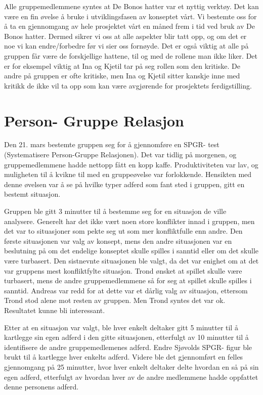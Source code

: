 Alle gruppemedlemmene syntes at De Bonos hatter var et nyttig verktøy. Det kan være en fin øvelse å bruke i utviklingsfasen av konseptet vårt. Vi bestemte oss for å ta en gjennomgang av hele prosjektet vårt en måned frem i tid ved bruk av De Bonos hatter. Dermed sikrer vi oss at alle aspekter blir tatt opp, og om det er noe vi kan endre/forbedre før vi sier oss fornøyde. Det er også viktig at alle på gruppen får være de forskjellige hattene, til og med de rollene man ikke liker. Det er for eksempel viktig at Ina og Kjetil tar på seg rollen som den kritiske. De andre på gruppen er ofte kritiske, men Ina og Kjetil sitter kanskje inne med kritikk de ikke vil ta opp som kan være avgjørende for prosjektets ferdigstilling. 



\section{Person- Gruppe Relasjon} %
Den 21. mars bestemte gruppen seg for å gjennomføre en SPGR- test (Systematisere Person-Gruppe Relasjonen). Det var tidlig på morgenen, og gruppemedlemmene hadde nettopp fått en kopp kaffe. Produktiviteten var lav, og muligheten til å kvikne til med en gruppeøvelse var forlokkende. Hensikten med denne øvelsen var å se på hvilke typer adferd som fant sted i gruppen, gitt en bestemt situasjon. 

Gruppen ble gitt 3 minutter til å bestemme seg for en situasjon de ville analysere. Generelt har det ikke vært noen store konflikter innad i gruppen, men det var to situasjoner som pekte seg ut som mer konfliktfulle enn andre. Den første situasjonen var valg av konsept, mens den andre situasjonen var en beslutning på om det endelige konseptet skulle spilles i sanntid eller om det skulle være turbasert. Den sistnevnte situasjonen ble valgt, da det var enighet om at det var gruppens mest konfliktfylte situasjon. Trond ønsket at spillet skulle være turbasert, mens de andre gruppemedlemmene så for seg at spillet skulle spilles i sanntid. Andreas var redd for at dette var et dårlig valg av situasjon, ettersom Trond stod alene mot resten av gruppen. Men Trond syntes det var ok. Resultatet kunne bli interessant.

Etter at en situasjon var valgt, ble hver enkelt deltaker gitt 5 minutter til å kartlegge sin egen adferd i den gitte situasjonen, etterfulgt av 10 minutter til å identifisere de andre gruppemedlemenes adferd. Endre Sjøvolds SPGR- figur ble brukt til å kartlegge hver enkelts adferd. Videre ble det gjennomført en felles gjennomgang på 25 minutter, hvor hver enkelt deltaker delte hvordan en så på sin egen adferd, etterfulgt av hvordan hver av de andre medlemmene hadde oppfattet denne personens adferd. 

